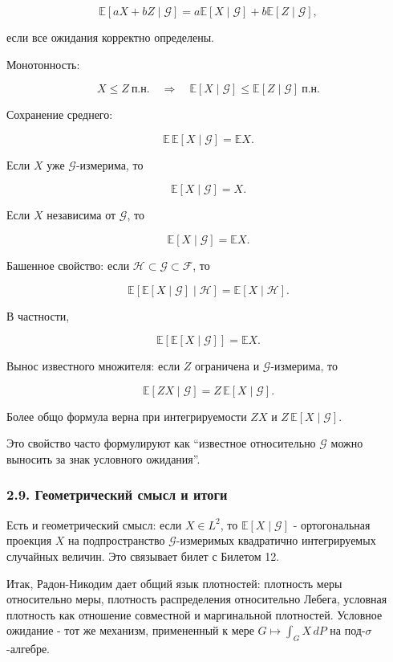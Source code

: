 \documentclass[
  11pt,
  a4paper,
]{article}
\begin{document}
\[
\mathbb E[aX+bZ\mid\mathcal G]
=
a\mathbb E[X\mid\mathcal G]
+b\mathbb E[Z\mid\mathcal G],
\]

если все ожидания корректно определены.

Монотонность:

\[
X\le Z\ \text{п.н.}
\quad\Longrightarrow\quad
\mathbb E[X\mid\mathcal G]\le\mathbb E[Z\mid\mathcal G]\ \text{п.н.}
\]

Сохранение среднего:

\[
\mathbb E\,\mathbb E[X\mid\mathcal G]=\mathbb EX.
\]

Если \(X\) уже \(\mathcal G\)-измерима, то

\[
\mathbb E[X\mid\mathcal G]=X.
\]

Если \(X\) независима от \(\mathcal G\), то

\[
\mathbb E[X\mid\mathcal G]=\mathbb EX.
\]

Башенное свойство: если
\(\mathcal H\subset\mathcal G\subset\mathcal F\), то

\[
\mathbb E[\mathbb E[X\mid\mathcal G]\mid\mathcal H]
=
\mathbb E[X\mid\mathcal H].
\]

В частности,

\[
\mathbb E[\mathbb E[X\mid\mathcal G]]
=
\mathbb EX.
\]

Вынос известного множителя: если \(Z\) ограничена и
\(\mathcal G\)-измерима, то

\[
\mathbb E[ZX\mid\mathcal G]
=
Z\,\mathbb E[X\mid\mathcal G].
\]

Более общо формула верна при интегрируемости \(ZX\) и
\(Z\,\mathbb E[X\mid\mathcal G]\).

Это свойство часто формулируют как ``известное относительно
\(\mathcal G\) можно выносить за знак условного ожидания''.

\subsubsection{2.9. Геометрический смысл и
итоги}\label{ux433ux435ux43eux43cux435ux442ux440ux438ux447ux435ux441ux43aux438ux439-ux441ux43cux44bux441ux43b-ux438-ux438ux442ux43eux433ux438}

Есть и геометрический смысл: если \(X\in L^2\), то
\(\mathbb E[X\mid\mathcal G]\) - ортогональная проекция \(X\) на
подпространство \(\mathcal G\)-измеримых квадратично интегрируемых
случайных величин. Это связывает билет с Билетом 12.

Итак, Радон-Никодим дает общий язык плотностей: плотность меры
относительно меры, плотность распределения относительно Лебега, условная
плотность как отношение совместной и маргинальной плотностей. Условное
ожидание - тот же механизм, примененный к мере \(G\mapsto\int_G X\,dP\)
на под-\(\sigma\)-алгебре.
\end{document}
